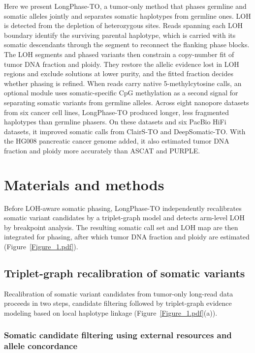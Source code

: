 \documentclass[unnumsec,webpdf,contemporary,large]{oup-authoring-template}
\begin{document}
Here we present LongPhase-TO, a tumor-only method that phases germline and somatic alleles jointly and separates somatic haplotypes from germline ones. LOH is detected from the depletion of heterozygous sites. Reads spanning each LOH boundary identify the surviving parental haplotype, which is carried with its somatic descendants through the segment to reconnect the flanking phase blocks. The LOH segments and phased variants then constrain a copy-number fit of tumor DNA fraction and ploidy. They restore the allelic evidence lost in LOH regions and exclude solutions at lower purity, and the fitted fraction decides whether phasing is refined. When reads carry native 5-methylcytosine calls, an optional module uses somatic-specific CpG methylation as a second signal for separating somatic variants from germline alleles. Across eight nanopore datasets from six cancer cell lines, LongPhase-TO produced longer, less fragmented haplotypes than germline phasers. On these datasets and six PacBio HiFi datasets, it improved somatic calls from ClairS-TO and DeepSomatic-TO. With the HG008 pancreatic cancer genome added, it also estimated tumor DNA fraction and ploidy more accurately than ASCAT and PURPLE.


\section{Materials and methods}\label{methods}

Before LOH-aware somatic phasing, LongPhase-TO independently recalibrates somatic variant candidates by a triplet-graph model and detects arm-level LOH by breakpoint analysis. The resulting somatic call set and LOH map are then integrated for phasing, after which tumor DNA fraction and ploidy are estimated (Figure~\ref{Figure_1.pdf}).

\subsection{Triplet-graph recalibration of somatic variants}

Recalibration of somatic variant candidates from tumor-only long-read data proceeds in two steps, candidate filtering followed by triplet-graph evidence modeling based on local haplotype linkage (Figure~\ref{Figure_1.pdf}(a)).

\subsubsection{Somatic candidate filtering using external resources and allele concordance}
\end{document}
